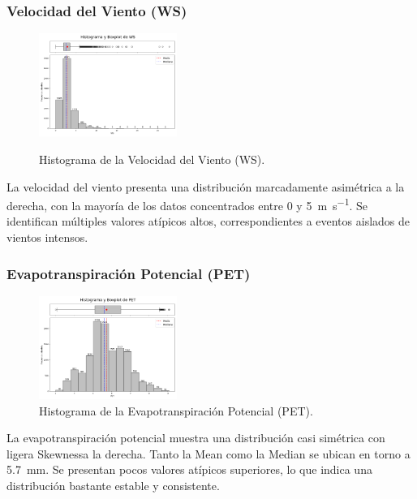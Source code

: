 \subsubsection*{Velocidad del Viento (WS)}

\begin{figure}[H]
    \caption{Histograma de la Velocidad del Viento (WS).}
    \centering
    \includegraphics[width=0.4\textwidth]{resultados/global/univariado/WS_histograma.png}
    \label{fig:WS_histograma}
\end{figure}

La velocidad del viento presenta una distribución marcadamente asimétrica a la derecha, con la mayoría de los datos concentrados entre 0 y \SI{5}{\meter\per\second}. Se identifican múltiples valores atípicos altos, correspondientes a eventos aislados de vientos intensos.

\newpage



\subsubsection{Evapotranspiración Potencial (PET)}

\begin{figure}[H]
    \centering
    \includegraphics[width=0.4\textwidth]{resultados/global/univariado/PET_histograma.png}
    \caption{Histograma de la Evapotranspiración Potencial (PET).}
    \label{fig:PET_histograma}
\end{figure}

La evapotranspiración potencial muestra una distribución casi simétrica con ligera Skewnessa la derecha. Tanto la Mean como la Median se ubican en torno a \SI{5.7}{\milli\meter}. Se presentan pocos valores atípicos superiores, lo que indica una distribución bastante estable y consistente.

